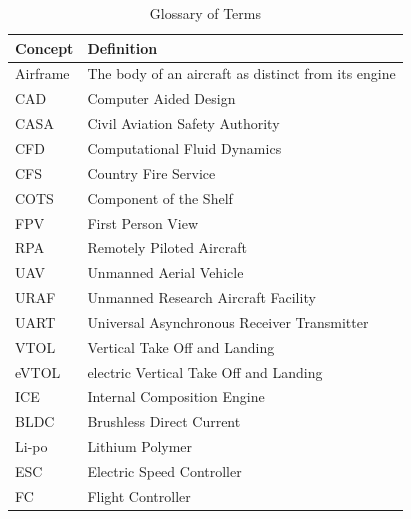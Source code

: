 \begin{table}[h!]
    \centering
    \caption{Glossary of Terms}
    \label{tab:definitions}
    \begin{tabular}{l|l}
        Concept & Definition\\\hline
        Airframe & The body of an aircraft as distinct from its engine\\
        CAD & Computer Aided Design\\
        CASA & Civil Aviation Safety Authority\\
        CFD & Computational Fluid Dynamics\\
        CFS & Country Fire Service\\
        COTS & Component of the Shelf\\
        FPV & First Person View\\
        RPA & Remotely Piloted Aircraft\\
        UAV & Unmanned Aerial Vehicle \\
        URAF & Unmanned Research Aircraft Facility\\
        UART & Universal Asynchronous Receiver Transmitter\\
        VTOL & Vertical Take Off and Landing\\
        eVTOL & electric Vertical Take Off and Landing\\
        ICE & Internal Composition Engine\\
        BLDC & Brushless Direct Current\\
        Li-po & Lithium Polymer\\
        ESC & Electric Speed Controller\\
        FC & Flight Controller\\
    \end{tabular}
\end{table}

